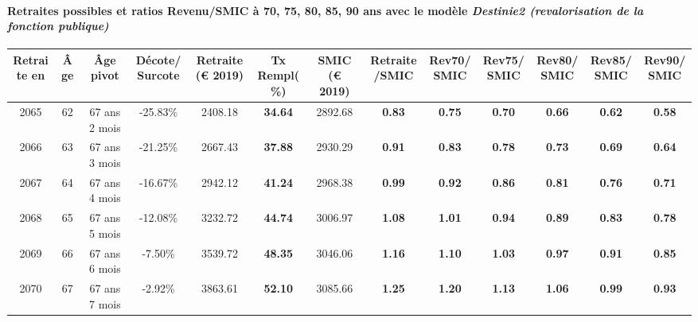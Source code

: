 \paragraph{Retraites possibles et ratios Revenu/SMIC à 70, 75, 80, 85, 90 ans avec le modèle \emph{Destinie2 (revalorisation de la fonction publique)}}  
 
{ \scriptsize \begin{center} 
\begin{tabular}[htb]{|c|c||c|c||c|c||c||c|c|c|c|c|c|} 
\hline 
 Retraite en &  Âge &  Âge pivot &  Décote/Surcote &  Retraite (\euro{} 2019) &  Tx Rempl(\%) &  SMIC (\euro{} 2019) &  Retraite/SMIC &  Rev70/SMIC &  Rev75/SMIC &  Rev80/SMIC &  Rev85/SMIC &  Rev90/SMIC \\ 
\hline \hline 
 2065 &  62 &  67 ans 2 mois &  -25.83\% &  2408.18 &  {\bf 34.64} &  2892.68 &  {\bf {\color{red} 0.83}} &  {\bf {\color{red} 0.75}} &  {\bf {\color{red} 0.70}} &  {\bf {\color{red} 0.66}} &  {\bf {\color{red} 0.62}} &  {\bf {\color{red} 0.58}} \\ 
\hline 
 2066 &  63 &  67 ans 3 mois &  -21.25\% &  2667.43 &  {\bf 37.88} &  2930.29 &  {\bf {\color{red} 0.91}} &  {\bf {\color{red} 0.83}} &  {\bf {\color{red} 0.78}} &  {\bf {\color{red} 0.73}} &  {\bf {\color{red} 0.69}} &  {\bf {\color{red} 0.64}} \\ 
\hline 
 2067 &  64 &  67 ans 4 mois &  -16.67\% &  2942.12 &  {\bf 41.24} &  2968.38 &  {\bf {\color{red} 0.99}} &  {\bf {\color{red} 0.92}} &  {\bf {\color{red} 0.86}} &  {\bf {\color{red} 0.81}} &  {\bf {\color{red} 0.76}} &  {\bf {\color{red} 0.71}} \\ 
\hline 
 2068 &  65 &  67 ans 5 mois &  -12.08\% &  3232.72 &  {\bf 44.74} &  3006.97 &  {\bf 1.08} &  {\bf 1.01} &  {\bf {\color{red} 0.94}} &  {\bf {\color{red} 0.89}} &  {\bf {\color{red} 0.83}} &  {\bf {\color{red} 0.78}} \\ 
\hline 
 2069 &  66 &  67 ans 6 mois &  -7.50\% &  3539.72 &  {\bf 48.35} &  3046.06 &  {\bf 1.16} &  {\bf 1.10} &  {\bf 1.03} &  {\bf {\color{red} 0.97}} &  {\bf {\color{red} 0.91}} &  {\bf {\color{red} 0.85}} \\ 
\hline 
 2070 &  67 &  67 ans 7 mois &  -2.92\% &  3863.61 &  {\bf 52.10} &  3085.66 &  {\bf 1.25} &  {\bf 1.20} &  {\bf 1.13} &  {\bf 1.06} &  {\bf {\color{red} 0.99}} &  {\bf {\color{red} 0.93}} \\ 
\hline 
\hline 
\end{tabular} 
\end{center} } 

